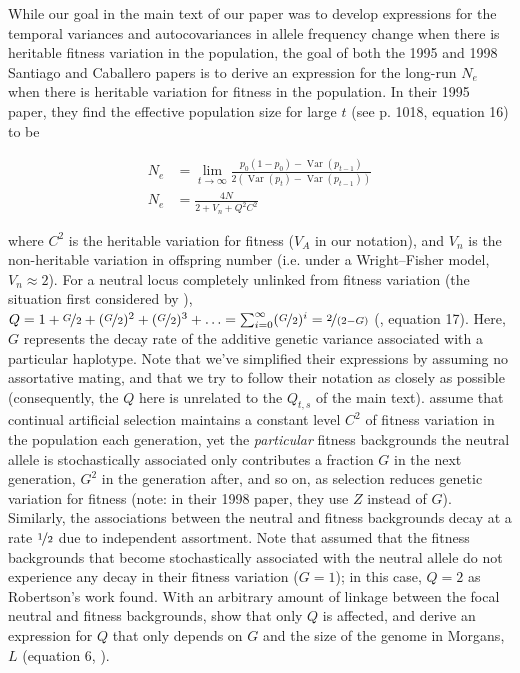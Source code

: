 \documentclass[11pt]{article}
\DeclareMathOperator{\var}{Var}
\begin{document}
While our goal in the main text of our paper was to develop expressions for the
temporal variances and autocovariances in allele frequency change when there is
heritable fitness variation in the population, the goal of both the 1995 and
1998 Santiago and Caballero papers is to derive an expression for the long-run
$N_e$ when there is heritable variation for fitness in the population. In their
1995 paper, they find the effective population size for large $t$ (see p. 1018,
equation 16) to be

\begin{align}
  N_e &= \lim_{t \to \infty} \frac{p_0(1-p_0) - \var(p_{t-1})}{2(\var(p_t) - \var(p_{t-1}))}  \\
  N_e &= \frac{4N}{2 + V_n + Q^2 C^2}
\end{align}
%

where $C^2$ is the heritable variation for fitness ($V_A$ in our notation), and
$V_n$ is the non-heritable variation in offspring number (i.e. under a
Wright--Fisher model, $V_n \approx 2$). For a neutral locus completely unlinked
from fitness variation (the situation first considered by
\cite{Robertson1961-ho}), $Q = 1 + \nicefrac{G}{2} + (\nicefrac{G}{2})^2 +
(\nicefrac{G}{2})^3 + \ldots = \sum_{i=0}^\infty (\nicefrac{G}{2})^i =
\nicefrac{2}{(2 - G)}$ (\cite{Santiago1995-hx}, equation 17). Here, $G$
represents the decay rate of the additive genetic variance associated with a
particular haplotype. Note that we've simplified their expressions by assuming
no assortative mating, and that we try to follow their notation as closely as
possible (consequently, the $Q$ here is unrelated to the $Q_{t,s}$ of the main
text).  \textcite{Santiago1995-hx} assume that continual artificial selection
maintains a constant level $C^2$ of fitness variation in the population each
generation, yet the \emph{particular} fitness backgrounds the neutral allele is
stochastically associated only contributes a fraction $G$ in the next
generation, $G^2$ in the generation after, and so on, as selection reduces
genetic variation for fitness (note: in their 1998 paper, they use $Z$ instead
of $G$). Similarly, the associations between the neutral and fitness
backgrounds decay at a rate $\nicefrac{1}{2}$ due to independent assortment.
Note that \textcite{Robertson1961-ho} assumed that the fitness backgrounds that
become stochastically associated with the neutral allele do not experience any
decay in their fitness variation ($G=1$); in this case, $Q = 2$ as Robertson's
work found. With an arbitrary amount of linkage between the focal neutral and
fitness backgrounds, \textcite{Santiago1998-bs} show that only $Q$ is affected,
and derive an expression for $Q$ that only depends on $G$ and the size of the
genome in Morgans, $L$ (equation 6, \citeyear{Santiago1998-bs}). 
\end{document}
